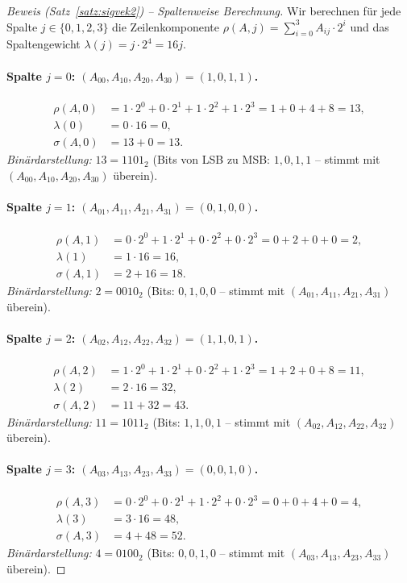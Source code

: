 ﻿\documentclass[a4paper,12pt]{scrreprt}
\theoremstyle{definition}
\begin{document}
\begin{proof}[Beweis (Satz~\ref{satz:sigvek2}) -- Spaltenweise Berechnung]
Wir berechnen für jede Spalte $j \in \{0,1,2,3\}$ die Zeilenkomponente $\rho(A,j) = \sum_{i=0}^{3} A_{ij} \cdot 2^i$ und das Spaltengewicht $\lambda(j) = j \cdot 2^4 = 16j$.

\paragraph{Spalte $j=0$: $(A_{00}, A_{10}, A_{20}, A_{30}) = (1, 0, 1, 1)$.}
\begin{align*}
\rho(A,0) &= 1 \cdot 2^0 + 0 \cdot 2^1 + 1 \cdot 2^2 + 1 \cdot 2^3 = 1 + 0 + 4 + 8 = 13, \\
\lambda(0) &= 0 \cdot 16 = 0, \\
\sigma(A,0) &= 13 + 0 = 13.
\end{align*}
\emph{Binärdarstellung:} $13 = 1101_2$ (Bits von LSB zu MSB: $1, 0, 1, 1$ -- stimmt mit $(A_{00}, A_{10}, A_{20}, A_{30})$ überein). \checkmark

\paragraph{Spalte $j=1$: $(A_{01}, A_{11}, A_{21}, A_{31}) = (0, 1, 0, 0)$.}
\begin{align*}
\rho(A,1) &= 0 \cdot 2^0 + 1 \cdot 2^1 + 0 \cdot 2^2 + 0 \cdot 2^3 = 0 + 2 + 0 + 0 = 2, \\
\lambda(1) &= 1 \cdot 16 = 16, \\
\sigma(A,1) &= 2 + 16 = 18.
\end{align*}
\emph{Binärdarstellung:} $2 = 0010_2$ (Bits: $0, 1, 0, 0$ -- stimmt mit $(A_{01}, A_{11}, A_{21}, A_{31})$ überein). \checkmark

\paragraph{Spalte $j=2$: $(A_{02}, A_{12}, A_{22}, A_{32}) = (1, 1, 0, 1)$.}
\begin{align*}
\rho(A,2) &= 1 \cdot 2^0 + 1 \cdot 2^1 + 0 \cdot 2^2 + 1 \cdot 2^3 = 1 + 2 + 0 + 8 = 11, \\
\lambda(2) &= 2 \cdot 16 = 32, \\
\sigma(A,2) &= 11 + 32 = 43.
\end{align*}
\emph{Binärdarstellung:} $11 = 1011_2$ (Bits: $1, 1, 0, 1$ -- stimmt mit $(A_{02}, A_{12}, A_{22}, A_{32})$ überein). \checkmark

\paragraph{Spalte $j=3$: $(A_{03}, A_{13}, A_{23}, A_{33}) = (0, 0, 1, 0)$.}
\begin{align*}
\rho(A,3) &= 0 \cdot 2^0 + 0 \cdot 2^1 + 1 \cdot 2^2 + 0 \cdot 2^3 = 0 + 0 + 4 + 0 = 4, \\
\lambda(3) &= 3 \cdot 16 = 48, \\
\sigma(A,3) &= 4 + 48 = 52.
\end{align*}
\emph{Binärdarstellung:} $4 = 0100_2$ (Bits: $0, 0, 1, 0$ -- stimmt mit $(A_{03}, A_{13}, A_{23}, A_{33})$ überein). \checkmark


\end{proof}
\end{document}

